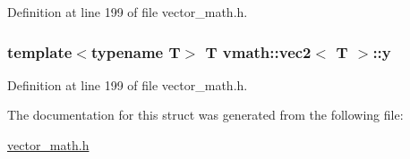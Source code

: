 Definition at line 199 of file vector\-\_\-math.\-h.

\hypertarget{structvmath_1_1vec2_a5765f3cb7f8103a31abc84622fcfab87}{
\subsubsection[{y}]{\setlength{\rightskip}{0pt plus 5cm}template$<$typename T$>$ T {\bf vmath\-::vec2}$<$ T $>$\-::y}}\label{structvmath_1_1vec2_a5765f3cb7f8103a31abc84622fcfab87}


Definition at line 199 of file vector\-\_\-math.\-h.



The documentation for this struct was generated from the following file\-:\begin{DoxyCompactItemize}
\item 
\hyperlink{vector__math_8h}{vector\-\_\-math.\-h}\end{DoxyCompactItemize}
